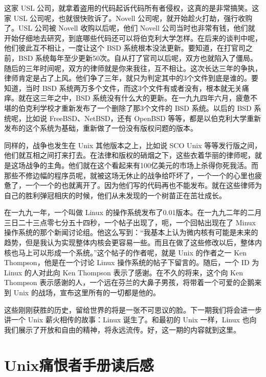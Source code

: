 \documentclass[
  letterpaper,
  DIV=11,
  numbers=noendperiod]{scrreprt}
\begin{document}
这家 USL
公司，就拿着盗用的代码起诉代码所有者侵权，这真的是非常搞笑。这家 USL
公司呢，也就很快败诉了。Novell 公司呢，就开始趁火打劫，强行收购了。USL
公司被 Novell 收购以后呢，他们 Novell
公司当时也非常有钱，他们就开始仔细地去研究，到底哪些代码还可以将伯克利大学怎样。在后来的谈判中呢，他们彼此互不相让，一度让这个
BSD 系统根本没法更新。要知道，在打官司之前，BSD
系统每年至少更新50次。自从打了官司以后呢，双方也就陷入了僵局。随后的三年时间呢，双方的律师就是你来我往，互不相让。这次长达三年的争执，律师肯定是占了上风。他们争了三年，就只为判定其中的3个文件到底是谁的。要知道，当时
BSD
系统两万多个文件，而这3个文件有或者没有，根本就无关痛痒。就在这三年之中，BSD
系统没有什么大的更新。在一九九四年六月，疲惫不堪的伯克利学校才重新发布了一个删除了那3个文件的
BSD 系统。以后的 BSD 系统呢，比如说 FreeBSD、NetBSD，还有 OpenBSD
等等，都是以伯克利大学重新发布的这个系统为基础，重新做了一份没有版权问题的版本。

同样的，战争也发生在 Unix 其他版本之上，比如说 SCO Unix
等等发行版之间，他们就互相之间打来打去。在法律和版权的硝烟之下，这些衣着华丽的律师呢，就是这场战争的主角。他们就在这个看起来有100亿美元的市场上杀得你死我活。而那些不修边幅的程序员呢，就被这场无休止的战争给吓坏了，一个一个的心里也疲惫了，一个一个的也就离开了。因为他们写的代码再也不能发布。就在这些律师为自己的胜利弹冠相庆的时候，他们从未发现的一个树苗正在茁壮成长。

在一九九一年，一个叫做 Linux
的操作系统发布了0.01版本。在一九九二年的二月三日二十三点零七分五十四秒，一个帖子出现了，呃，一个回帖出现在了
Minux
操作系统的那个新闻讨论组。他这么写到：``我基本上认为微内核有可能是未来的趋势，但是我认为实现整体内核会更容易一些。而且在做了这些修改以后，整体内核也马上可以形成一个系统。''这个帖子的作者呢，就是
Unix 的作者之一 Ken Thompson，他是在一个讨论 Linux
操作系统的帖子下留言的。随后，一个 ID 为 Linux 的人对此向 Ken Thompson
表示了感谢。在不久的将来，这个向 Ken Thompson
表示感谢的人，一个远在芬兰的大鼻子男孩，将带着一个可爱的企鹅来到 Unix
的战场，宣布这里所有的一切都是他的。

这些刚刚获胜的历史，留给世界的将是一张不可思议的脸。下一期我们将会进一步讲一个
Unix 薪火相传的故事：Linux 诞生了。和最初的 Unix 一样，Linux
也向我们展示了开放和自由的精神，将永远流传。好，这一期的内容就到这里。


\chapter{Unix痛恨者手册读后感}\label{unixux75dbux6068ux8005ux624bux518cux8bfbux540eux611f}
\end{document}
